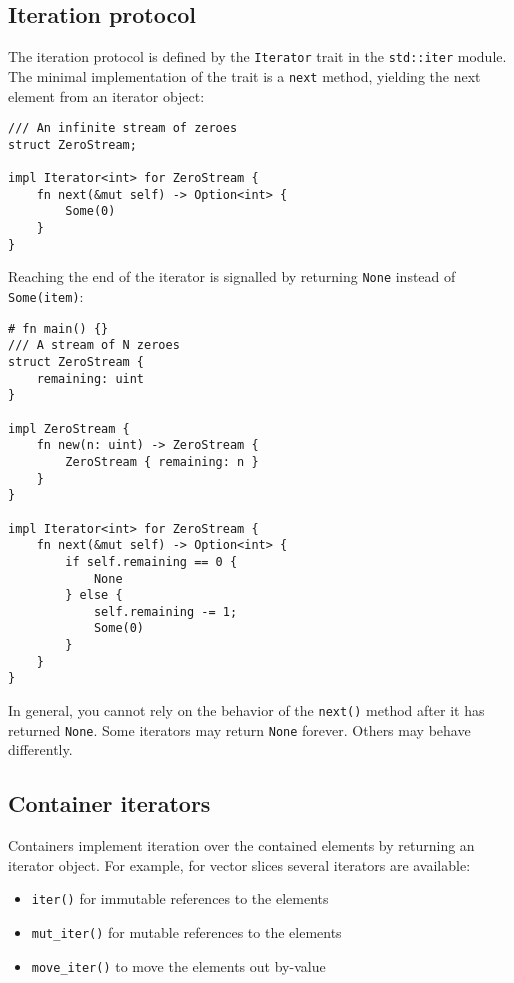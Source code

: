 \documentclass[]{article}
\begin{document}
\subsection{Iteration protocol}\label{iteration-protocol}

The iteration protocol is defined by the \texttt{Iterator} trait in the
\texttt{std::iter} module. The minimal implementation of the trait is a
\texttt{next} method, yielding the next element from an iterator object:

\begin{verbatim}
/// An infinite stream of zeroes
struct ZeroStream;

impl Iterator<int> for ZeroStream {
    fn next(&mut self) -> Option<int> {
        Some(0)
    }
}
\end{verbatim}

Reaching the end of the iterator is signalled by returning \texttt{None}
instead of \texttt{Some(item)}:

\begin{verbatim}
# fn main() {}
/// A stream of N zeroes
struct ZeroStream {
    remaining: uint
}

impl ZeroStream {
    fn new(n: uint) -> ZeroStream {
        ZeroStream { remaining: n }
    }
}

impl Iterator<int> for ZeroStream {
    fn next(&mut self) -> Option<int> {
        if self.remaining == 0 {
            None
        } else {
            self.remaining -= 1;
            Some(0)
        }
    }
}
\end{verbatim}

In general, you cannot rely on the behavior of the \texttt{next()}
method after it has returned \texttt{None}. Some iterators may return
\texttt{None} forever. Others may behave differently.

\subsection{Container iterators}\label{container-iterators}

Containers implement iteration over the contained elements by returning
an iterator object. For example, for vector slices several iterators are
available:

\begin{itemize}
\itemsep1pt\parskip0pt
\item
  \texttt{iter()} for immutable references to the elements
\item
  \texttt{mut\_iter()} for mutable references to the elements
\item
  \texttt{move\_iter()} to move the elements out by-value
\end{itemize}
\end{document}
